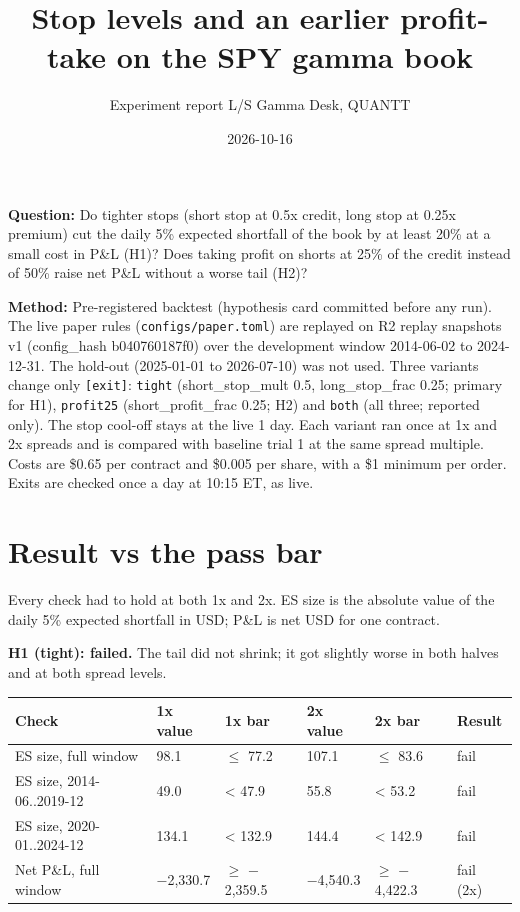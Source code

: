 \documentclass{article}
\title{Stop levels and an earlier profit-take on the SPY gamma book}
\author{Experiment report \textperiodcentered{} L/S Gamma Desk, QUANTT}
\date{2026-10-16}
\begin{document}
\maketitle

\textbf{Question:} Do tighter stops (short stop at 0.5x credit, long stop at 0.25x premium) cut the daily 5\% expected shortfall of the book by at least 20\% at a small cost in P\&L (H1)? Does taking profit on shorts at 25\% of the credit instead of 50\% raise net P\&L without a worse tail (H2)?

\textbf{Method:} Pre-registered backtest (hypothesis card committed before any run). The live paper rules (\texttt{configs/\allowbreak{}paper.\allowbreak{}toml}) are replayed on R2 replay snapshots v1 (config\_hash b040760187f0) over the development window 2014-06-02 to 2024-12-31. The hold-out (2025-01-01 to 2026-07-10) was not used. Three variants change only \texttt{[exit]}: \texttt{tight} (short\_stop\_mult 0.5, long\_stop\_frac 0.25; primary for H1), \texttt{profit25} (short\_profit\_frac 0.25; H2) and \texttt{both} (all three; reported only). The stop cool-off stays at the live 1 day. Each variant ran once at 1x and 2x spreads and is compared with baseline trial 1 at the same spread multiple. Costs are \$0.65 per contract and \$0.005 per share, with a \$1 minimum per order. Exits are checked once a day at 10:15 ET, as live.

\section{Result vs the pass bar}

Every check had to hold at both 1x and 2x. ES size is the absolute value of the daily 5\% expected shortfall in USD; P\&L is net USD for one contract.

\textbf{H1 (tight): failed.} The tail did not shrink; it got slightly worse in both halves and at both spread levels.

\begin{center}\small
\begin{tabularx}{\linewidth}{>{\raggedright\arraybackslash}X l l l l l}
\toprule
\textbf{Check} & \textbf{1x value} & \textbf{1x bar} & \textbf{2x value} & \textbf{2x bar} & \textbf{Result} \\
\midrule
ES size, full window & 98.1 & \ensuremath{\leq} 77.2 & 107.1 & \ensuremath{\leq} 83.6 & fail \\
ES size, 2014-06..2019-12 & 49.0 & < 47.9 & 55.8 & < 53.2 & fail \\
ES size, 2020-01..2024-12 & 134.1 & < 132.9 & 144.4 & < 142.9 & fail \\
Net P\&L, full window & \ensuremath{-}2,330.7 & \ensuremath{\geq} \ensuremath{-}2,359.5 & \ensuremath{-}4,540.3 & \ensuremath{\geq} \ensuremath{-}4,422.3 & fail (2x) \\
\bottomrule
\end{tabularx}
\end{center}
\end{document}
